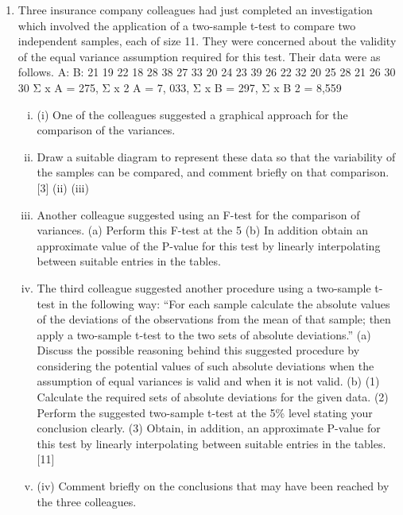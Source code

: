 \documentclass[a4paper,12pt]{article}
\begin{document}
\begin{enumerate}
\item Three insurance company colleagues had just completed an investigation which
involved the application of a two-sample t-test to compare two independent samples, each of size 11. They were concerned about the validity of the equal variance assumption required for this test. Their data were as follows.
A:
B:
21
19
22
18
28
38
27
33
20
24
23
39
26
22
32
20
25
28
21
26
30
30
Σ x A = 275, Σ x 2 A = 7, 033, Σ x B = 297, Σ x B 2 = 8,559
\begin{enumerate}[(i)]
\item (i)
One of the colleagues suggested a graphical approach for the comparison of the variances.
\item Draw a suitable diagram to represent these data so that the variability of the samples can be compared, and comment briefly on that comparison.
[3]
(ii)
(iii)
\item Another colleague suggested using an F-test for the comparison of variances.
(a) Perform this F-test at the 5%
(b) In addition obtain an approximate value of the P-value for this test by linearly interpolating between suitable entries in the tables.
\item 
The third colleague suggested another procedure using a two-sample t-test in the following way:
“For each sample calculate the absolute values of the deviations of the observations from the mean of that sample;
then apply a two-sample t-test to the two sets of absolute deviations.”
(a) Discuss the possible reasoning behind this suggested procedure by considering the potential values of such absolute deviations when the assumption of equal variances is valid and when it is not valid.
(b) (1) Calculate the required sets of absolute deviations for the given
data.
(2) Perform the suggested two-sample t-test at the 5\% level stating your conclusion clearly.
(3) Obtain, in addition, an approximate P-value for this test by linearly interpolating between suitable entries in the tables.
[11]
\item (iv)
Comment briefly on the conclusions that may have been reached by the three
colleagues.
\end{enumerate}
\newpage


\end{enumerate}
\end{document}
